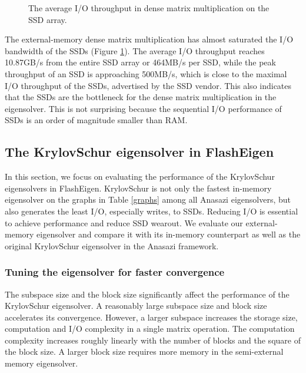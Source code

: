 %		

\begin{figure}
	\begin{center}
		\footnotesize
		\vspace{-15pt}
		
		\vspace{-15pt}
		\caption{The average I/O throughput in dense matrix multiplication
		on the SSD array.}
		\label{perf:dmm_io}
	\end{center}
\end{figure}

The external-memory dense matrix multiplication has almost saturated
the I/O bandwidth of the SSDs (Figure \ref{perf:dmm_io}). The average
I/O throughput reaches 10.87GB/s from the entire SSD array or 464MB/s
per SSD, while the peak throughput of an SSD is approaching 500MB/s,
which is close to the maximal I/O throughput of the SSDs, advertised by
the SSD vendor. This also indicates that the SSDs are the bottleneck for
the dense matrix multiplication in the eigensolver. This is not
surprising because the sequential I/O performance of SSDs is an order of
magnitude smaller than RAM. 

\subsection{The KrylovSchur eigensolver in FlashEigen}
In this section, we focus on evaluating the performance of the KrylovSchur
eigensolvers in FlashEigen. KrylovSchur is not only the fastest in-memory
eigensolver on the graphs in Table \ref{graphs} among all Anasazi eigensolvers,
but also generates the least I/O, especially writes,
to SSDs. Reducing I/O is essential to achieve performance and reduce SSD
wearout. We evaluate our external-memory eigensolver and compare it
with its in-memory counterpart as well as the original KrylovSchur eigensolver
in the Anasazi framework.

\subsubsection{Tuning the eigensolver for faster convergence}
The subspace size and the block size significantly affect the performance of
the KrylovSchur eigensolver. A reasonably large subspace size and block size
accelerates its convergence. However, a larger subspace increases the storage
size, computation and I/O complexity in a single matrix operation.
The computation complexity increases roughly linearly with the number of blocks
and the square of the block size. A larger block size requires more memory
in the semi-external memory eigensolver.


